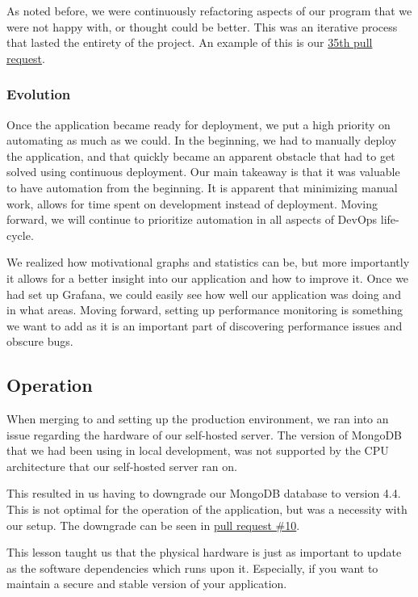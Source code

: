 \documentclass{article}
\begin{document}
As noted before, we were continuously refactoring aspects of our program that we were not happy with, or thought could be better. This was an iterative process that lasted the entirety of the project. An example of this is our \href{https://github.com/AlexBMJ/minitwit/pull/35}{35th pull request}.

\subsubsection{Evolution}
Once the application became ready for deployment, we put a high priority on automating as much as we could. In the beginning, we had to manually deploy the application, and that quickly became an apparent obstacle that had to get solved using continuous deployment. Our main takeaway is that it was valuable to have automation from the beginning. It is apparent that minimizing manual work, allows for time spent on development instead of deployment.
Moving forward, we will continue to prioritize automation in all aspects of DevOps life-cycle.

We realized how motivational graphs and statistics can be, but more importantly it allows for a better insight into our application and how to improve it. Once we had set up Grafana, we could easily see how well our application was doing and in what areas. Moving forward, setting up performance monitoring is something we want to add as it is an important part of discovering performance issues and obscure bugs.

\subsection{Operation}
When merging to and setting up the production environment, we ran into an issue regarding the hardware of our self-hosted server. The version of MongoDB that we had been using in local development, was not supported by the CPU architecture that our self-hosted server ran on. 

This resulted in us having to downgrade our MongoDB database to version 4.4. This is not optimal for the operation of the application, but was a necessity with our setup. The downgrade can be seen in \href{https://github.com/AlexBMJ/minitwit/pull/10}{pull request \#10}.

This lesson taught us that the physical hardware is just as important to update as the software dependencies which runs upon it. Especially, if you want to maintain a secure and stable version of your application.
\end{document}
